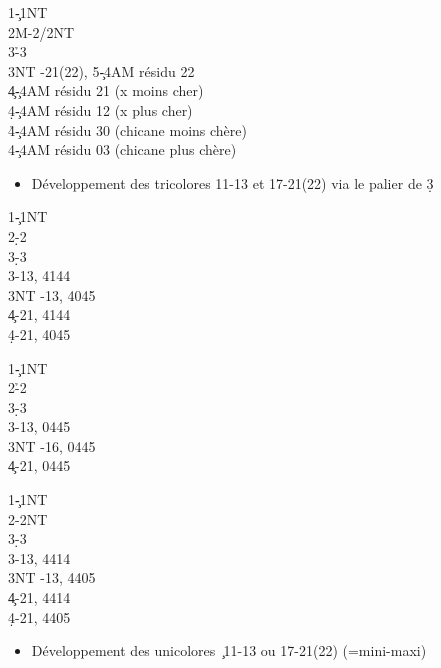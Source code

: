 \documentclass[a4paper]{article}
\begin{document}
\begin{bidtable}
1\c-1NT\\
2M-2\s/2NT\\
3\h-3\s\\
3NT -21(22), 5\c -4AM résidu 22\\
4\c {}\c -4AM résidu 21 (x moins cher)\\
4\d {}\c -4AM résidu 12 (x plus cher)\\
4\h {}\c -4AM résidu 30 (chicane moins chère)\\
4\s {}\c -4AM résidu 03 (chicane plus chère)
\end{bidtable}

\begin{itemize}
\item Développement des tricolores 11-13 et 17-21(22) via le palier de 3\d 

\end{itemize}

\begin{bidtable}
1\c-1NT\\
2\d-2\h\\
3\d-3\h\\
3\s {}-13, 4144\\
3NT -13, 4045\\
4\c {}-21, 4144\\
4\d {}-21, 4045
\end{bidtable}

\begin{bidtable}
1\c-1NT\\
2\h-2\s\\
3\d-3\h\\
3\s {}-13, 0445\\
3NT -16, 0445\\
4\c {}-21, 0445
\end{bidtable}

\begin{bidtable}
1\c-1NT\\
2\s-2NT\\
3\d-3\h\\
3\s {}-13, 4414\\
3NT -13, 4405\\
4\c {}-21, 4414\\
4\d {}-21, 4405
\end{bidtable}

\begin{itemize}
\item Développement des unicolores \c\ 11-13 ou 17-21(22) (=mini-maxi)

\end{itemize}
\end{document}
